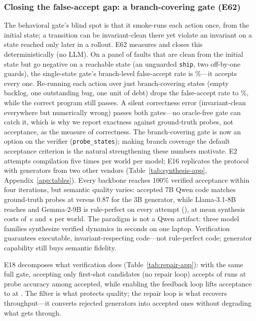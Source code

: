 \documentclass[11pt]{article}
\begin{document}
\subsubsection{Closing the false-accept gap: a branch-covering gate (E62)}\label{sec:branch-gate}
The behavioral gate's blind spot is that it smoke-runs each action once, from the
initial state; a transition can be invariant-clean there yet violate an invariant
on a state reached only later in a rollout. E62 measures and closes this
deterministically (no LLM). On a panel of \BranchFaults{} faults that are clean from
the initial state but go negative on a reachable state (an unguarded \texttt{ship},
two off-by-one guards), the single-state gate's branch-level false-accept rate is
\BranchSingleFA\%---it accepts every one. Re-running each action over just
\BranchProbes{} branch-covering states (empty backlog, one outstanding bug, one unit
of debt) drops the false-accept rate to \BranchCovFA\%, while the correct program
still passes. A silent correctness error
(invariant-clean everywhere but numerically wrong) passes both gates---no
oracle-free gate can catch it, which is why we report exactness against ground-truth
probes, not acceptance, as the measure of correctness. The branch-covering gate is
now an option on the verifier (\texttt{probe\_states}); making branch coverage the
default acceptance criterion is the natural strengthening these numbers motivate.
E2 attempts compilation five times per world per model; E16 replicates the
protocol with generators from two other vendors
(Table~\ref{tab:synthesis-app}, Appendix~\ref{app:tables}). Every backbone
reaches 100\% verified acceptance within four iterations, but semantic
quality varies: accepted 7B Qwen code matches ground-truth probes at
\SynthProbeBig{} versus 0.87 for the 3B generator, while Llama-3.1-8B reaches
\LlamaProbe{} and Gemma-2-9B is rule-perfect on every attempt
(\GemmaProbe), at mean synthesis costs of \LlamaWall\,s and \GemmaWall\,s per
world. The paradigm is not a Qwen artifact: three model families synthesize
verified dynamics in seconds on one laptop. Verification guarantees
executable, invariant-respecting code---not rule-perfect code; generator
capability still buys semantic fidelity.

E18 decomposes what verification does
(Table~\ref{tab:repair-app}): with the same full gate, accepting only
first-shot candidates (no repair loop) accepts \FilterAccept{} of runs at
probe accuracy \FilterProbeAccepted{} among accepted, while enabling the
feedback loop lifts acceptance to \LoopAccept{} at \LoopProbeAccepted.
The filter is what protects quality; the repair loop is what recovers
throughput---it converts rejected generators into accepted ones without
degrading what gets through.
\end{document}
